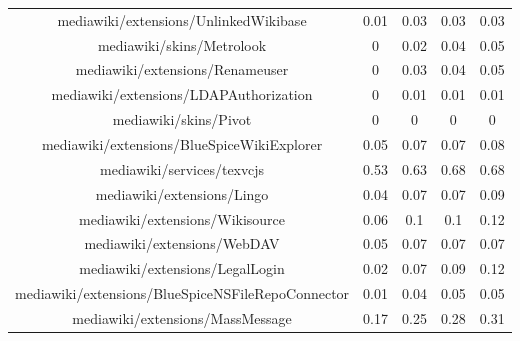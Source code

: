 \begin{center}
\begin{tabular}{@{}c c c c c@{}}
mediawiki/extensions/UnlinkedWikibase & 0.01 & 0.03 & 0.03 & 0.03 \\
mediawiki/skins/Metrolook & 0 & 0.02 & 0.04 & 0.05 \\
mediawiki/extensions/Renameuser & 0 & 0.03 & 0.04 & 0.05 \\
mediawiki/extensions/LDAPAuthorization & 0 & 0.01 & 0.01 & 0.01 \\
mediawiki/skins/Pivot & 0 & 0 & 0 & 0 \\
mediawiki/extensions/BlueSpiceWikiExplorer & 0.05 & 0.07 & 0.07 & 0.08 \\
mediawiki/services/texvcjs & 0.53 & 0.63 & 0.68 & 0.68 \\
mediawiki/extensions/Lingo & 0.04 & 0.07 & 0.07 & 0.09 \\
mediawiki/extensions/Wikisource & 0.06 & 0.1 & 0.1 & 0.12 \\
mediawiki/extensions/WebDAV & 0.05 & 0.07 & 0.07 & 0.07 \\
mediawiki/extensions/LegalLogin & 0.02 & 0.07 & 0.09 & 0.12 \\
mediawiki/extensions/BlueSpiceNSFileRepoConnector & 0.01 & 0.04 & 0.05 & 0.05 \\
mediawiki/extensions/MassMessage & 0.17 & 0.25 & 0.28 & 0.31 \\
\hline
\end{tabular}
\end{center}


